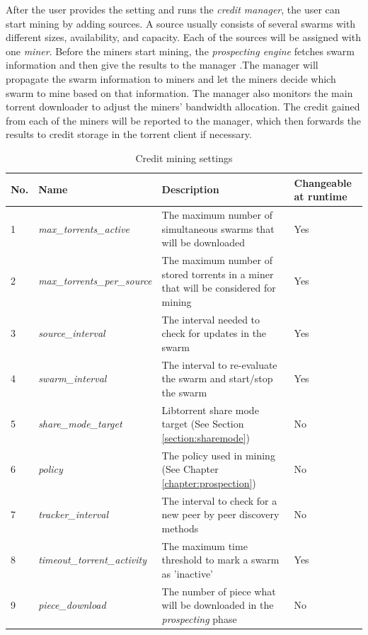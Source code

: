 After the user provides the setting and runs the \textit{credit manager}, the user can start mining by adding sources. A source usually consists of several swarms with different sizes, availability, and capacity. Each of the sources will be assigned with one \textit{miner}. Before the miners start mining, the \textit{prospecting engine} fetches swarm information and then give the results to the manager .The manager will propagate the swarm information to miners and let the miners decide which swarm to mine based on that information. The manager also monitors the main torrent downloader to adjust the miners' bandwidth allocation. The credit gained from each of the miners will be reported to the manager, which then forwards the results to credit storage in the torrent client if necessary.

\begin{table}[h]
	\centering
	\caption{Credit mining settings}
	\label{tbl:cmsettings}
	\begin{adjustwidth}{-1.5cm}{}
	\begin{tabular}{|p{1cm}|p{4cm}|p{7cm}|p{2cm}|}
		\hline
		\rowcolor[HTML]{EFEFEF} 
		No. & Name & Description & Changeable at runtime \\ \hline
	1 & \textit{max\_torrents\_active} & The maximum number of simultaneous swarms that will be downloaded & Yes \\ \hline
	2 & \textit{max\_torrents\_per\_source} & The maximum number of stored torrents in a miner that will be considered for mining & Yes \\ \hline
	3 & \textit{source\_interval} & The interval needed to check for updates in the swarm & Yes \\ \hline
	4 & \textit{swarm\_interval} & The interval to re-evaluate the swarm and start/stop the swarm & Yes \\ \hline
	5 & \textit{share\_mode\_target} & Libtorrent share mode target (See Section \ref{section:sharemode}) & No \\ \hline
	6 & \textit{policy} & The policy used in mining (See Chapter \ref{chapter:prospection}) & No \\ \hline
	7 & \textit{tracker\_interval} & The interval to check for a new peer by peer discovery methods & No \\ \hline
	8 & \textit{timeout\_torrent\_activity} & The maximum time threshold to mark a swarm as 'inactive' & Yes \\ \hline
	9 & \textit{piece\_download} & The number of piece what will be downloaded in the \textit{prospecting} phase & No \\ \hline
	\end{tabular}
	\end{adjustwidth}
\end{table}



